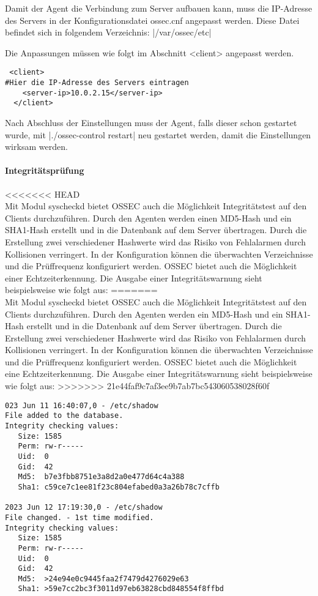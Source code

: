 \noindent Damit der Agent die Verbindung zum Server aufbauen kann, muss die IP-Adresse des Servers in der Konfigurationsdatei ossec.cnf angepasst werden. Diese Datei befindet sich in folgendem Verzeichnis: |/var/ossec/etc| 

\noindent Die Anpassungen müssen wie folgt im Abschnitt <client> angepasst werden.   
\begin{verbatim}
 <client>
#Hier die IP-Adresse des Servers eintragen
    <server-ip>10.0.2.15</server-ip> 
  </client>
\end{verbatim}

\noindent Nach Abschluss der Einstellungen muss der Agent, falls dieser schon gestartet wurde, mit |./ossec-control restart| neu gestartet werden, damit die Einstellungen wirksam werden.

\paragraph{Integritätsprüfung}
<<<<<<< HEAD
\noindent \\Mit Modul syscheckd bietet OSSEC auch die Möglichkeit Integritätstest auf den Clients durchzuführen. Durch den Agenten werden einen MD5-Hash und ein SHA1-Hash erstellt und in die Datenbank auf dem Server übertragen. Durch die Erstellung zwei verschiedener Hashwerte wird das Risiko von Fehlalarmen durch Kollisionen verringert. In der Konfiguration können die überwachten Verzeichnisse und die Prüffrequenz konfiguriert werden. OSSEC bietet auch die Möglichkeit einer Echtzeiterkennung. Die Ausgabe einer Integritätswarnung sieht beispielsweise wie folgt aus:
=======
\noindent \\Mit Modul syscheckd bietet OSSEC auch die Möglichkeit Integritätstest auf den Clients durchzuführen. Durch den Agenten werden ein MD5-Hash und ein SHA1-Hash erstellt und in die Datenbank auf dem Server übertragen. Durch die Erstellung zwei verschiedener Hashwerte wird das Risiko von Fehlalarmen durch Kollisionen verringert. In der Konfiguration können die überwachten Verzeichnisse und die Prüffrequenz konfiguriert werden. OSSEC bietet auch die Möglichkeit eine Echtzeiterkennung. Die Ausgabe einer Integritätswarnung sieht beispielsweise wie folgt aus:
>>>>>>> 21e44faf9c7af3ee9b7ab7bc543060538028f60f
\begin{verbatim}
023 Jun 11 16:40:07,0 - /etc/shadow
File added to the database. 
Integrity checking values:
   Size: 1585
   Perm: rw-r-----
   Uid:  0
   Gid:  42
   Md5:  b7e3fbb8751e3a8d2a0e477d64c4a388
   Sha1: c59ce7c1ee81f23c804efabed0a3a26b78c7cffb

2023 Jun 12 17:19:30,0 - /etc/shadow
File changed. - 1st time modified.
Integrity checking values:
   Size: 1585
   Perm: rw-r-----
   Uid:  0
   Gid:  42
   Md5:  >24e94e0c9445faa2f7479d4276029e63
   Sha1: >59e7cc2bc3f3011d97eb63828cbd848554f8ffbd
\end{verbatim}

